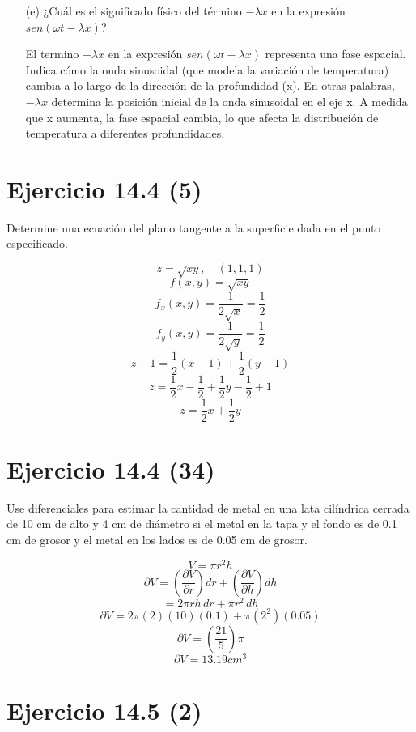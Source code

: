 \begin{enumerate}
    \item[(e)] ¿Cuál es el significado físico del término \(-\lambda x \) en la expresión \(sen(\omega t - \lambda x)\)?
    
    El termino \(-\lambda x \) en la expresión \(sen(\omega t - \lambda x)\) representa una fase espacial. Indica cómo la onda sinusoidal (que modela la variación de temperatura) cambia a lo largo de la dirección de la profundidad (x). En otras palabras, \(-\lambda x \) determina la posición inicial de la onda sinusoidal en el eje x. A medida que x aumenta, la fase espacial cambia, lo que afecta la distribución de temperatura a diferentes profundidades.
    
\end{enumerate} \newpage
\section{Ejercicio 14.4 (5)}

    Determine una ecuación del plano tangente a la superficie 
    dada en el punto especificado.

    \[z = \sqrt{xy}, \quad (1, 1, 1)\]
    \[ f(x, y) = \sqrt{xy}\]
    \[f_x(x, y) = \frac{1}{2\sqrt{x}} = \frac{1}{2}\]
    \[f_y(x, y) = \frac{1}{2\sqrt{y}} = \frac{1}{2}\]
    \[z - 1 = \frac{1}{2}(x - 1) + \frac{1}{2}(y - 1)\]
    \[z = \frac{1}{2}x - \frac{1}{2} + \frac{1}{2}y - \frac{1}{2} + 1\]
    \[z = \frac{1}{2}x + \frac{1}{2}y\]
    
   
\section{Ejercicio 14.4 (34)}

    Use diferenciales para estimar la cantidad de metal en una lata cilíndrica cerrada de 10 cm de alto y 4 cm de diámetro  si el metal en la tapa y el fondo es de 0.1 cm de grosor y el  metal en los lados es de 0.05 cm de grosor.

    \[V = \pi r^2 h\]
    \[\partial V = \left(\frac{\partial V}{\partial r}\right)dr + \left(\frac{\partial V}{\partial h}\right)dh\]
    \[= 2\pi rh\,dr + \pi r^2\,dh\]
    \[\partial V = 2\pi(2)(10)(0.1) + \pi(2^2)(0.05)\]
    \[\partial V = \left(\frac{21}{5}\right)\pi\]
    \[\partial V = 13.19 cm^3\]
    
\section{Ejercicio 14.5 (2)}

